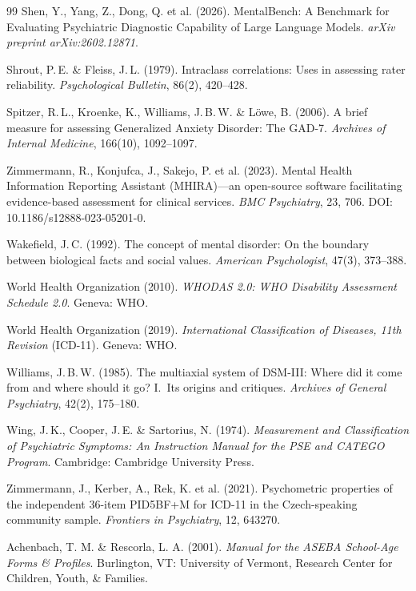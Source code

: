 \documentclass[11pt,a4paper]{article}
\begin{document}
\begin{thebibliography}{99}
Shen, Y., Yang, Z., Dong, Q. et al. (2026).
\newblock MentalBench: A Benchmark for Evaluating Psychiatric Diagnostic Capability of Large Language Models.
\newblock \textit{arXiv preprint arXiv:2602.12871}.

Shrout, P.\,E. \& Fleiss, J.\,L. (1979).
\newblock Intraclass correlations: Uses in assessing rater reliability.
\newblock \textit{Psychological Bulletin}, 86(2), 420--428.

Spitzer, R.\,L., Kroenke, K., Williams, J.\,B.\,W. \& L\"owe, B. (2006).
\newblock A brief measure for assessing Generalized Anxiety Disorder: The GAD-7.
\newblock \textit{Archives of Internal Medicine}, 166(10), 1092--1097.

Zimmermann, R., Konjufca, J., Sakejo, P. et al. (2023).
\newblock Mental Health Information Reporting Assistant (MHIRA)---an open-source software facilitating evidence-based assessment for clinical services.
\newblock \textit{BMC Psychiatry}, 23, 706. DOI: 10.1186/s12888-023-05201-0.

Wakefield, J.\,C. (1992).
\newblock The concept of mental disorder: On the boundary between biological facts and social values.
\newblock \textit{American Psychologist}, 47(3), 373--388.

World Health Organization (2010).
\newblock \textit{WHODAS 2.0: WHO Disability Assessment Schedule 2.0}.
\newblock Geneva: WHO.

World Health Organization (2019).
\newblock \textit{International Classification of Diseases, 11th Revision} (ICD-11).
\newblock Geneva: WHO.

Williams, J.\,B.\,W. (1985).
\newblock The multiaxial system of DSM-III: Where did it come from and where should it go? I.\ Its origins and critiques.
\newblock \textit{Archives of General Psychiatry}, 42(2), 175--180.

Wing, J.\,K., Cooper, J.\,E. \& Sartorius, N. (1974).
\newblock \textit{Measurement and Classification of Psychiatric Symptoms: An Instruction Manual for the PSE and CATEGO Program}.
\newblock Cambridge: Cambridge University Press.

Zimmermann, J., Kerber, A., Rek, K. et al. (2021).
\newblock Psychometric properties of the independent 36-item PID5BF+M for ICD-11 in the Czech-speaking community sample.
\newblock \textit{Frontiers in Psychiatry}, 12, 643270.

Achenbach, T. M. \& Rescorla, L. A. (2001).
\newblock \textit{Manual for the ASEBA School-Age Forms \& Profiles}.
\newblock Burlington, VT: University of Vermont, Research Center for Children, Youth, \& Families.

\end{thebibliography}
\end{document}
